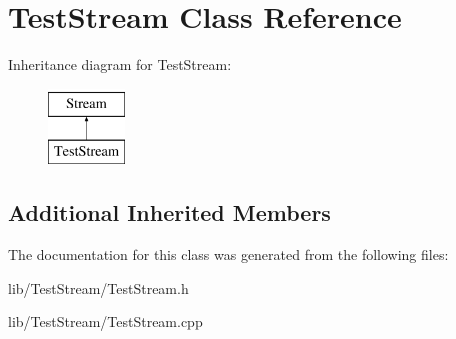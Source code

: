 \hypertarget{class_test_stream}{\section{Test\-Stream Class Reference}
\label{class_test_stream}
}
Inheritance diagram for Test\-Stream\-:\begin{figure}[H]
\begin{center}
\leavevmode
\includegraphics[height=2.000000cm]{class_test_stream}
\end{center}
\end{figure}
\subsection*{Additional Inherited Members}


The documentation for this class was generated from the following files\-:\begin{DoxyCompactItemize}
\item 
lib/\-Test\-Stream/Test\-Stream.\-h\item 
lib/\-Test\-Stream/Test\-Stream.\-cpp\end{DoxyCompactItemize}
